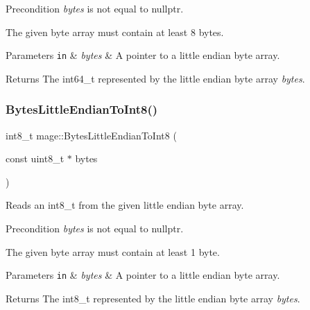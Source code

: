 \begin{DoxyPrecond}{Precondition}
{\itshape bytes} is not equal to {\ttfamily nullptr}. 

The given byte array must contain at least 8 bytes. 
\end{DoxyPrecond}

\begin{DoxyParams}[1]{Parameters}
\mbox{\tt in}  & {\em bytes} & A pointer to a little endian byte array. \\
\hline
\end{DoxyParams}
\begin{DoxyReturn}{Returns}
The {\ttfamily int64\+\_\+t} represented by the little endian byte array {\itshape bytes}. 
\end{DoxyReturn}
\hypertarget{namespacemage_a9153445c824967eb0805eeec7ac8fec5}{}\label{namespacemage_a9153445c824967eb0805eeec7ac8fec5} 
\subsubsection{\texorpdfstring{Bytes\+Little\+Endian\+To\+Int8()}{BytesLittleEndianToInt8()}}
{\footnotesize\ttfamily int8\+\_\+t mage\+::\+Bytes\+Little\+Endian\+To\+Int8 (\begin{DoxyParamCaption}\item[{const uint8\+\_\+t $\ast$}]{bytes }\end{DoxyParamCaption})\hspace{0.3cm}{\ttfamily [noexcept]}}

Reads an int8\+\_\+t from the given little endian byte array.

\begin{DoxyPrecond}{Precondition}
{\itshape bytes} is not equal to {\ttfamily nullptr}. 

The given byte array must contain at least 1 byte. 
\end{DoxyPrecond}

\begin{DoxyParams}[1]{Parameters}
\mbox{\tt in}  & {\em bytes} & A pointer to a little endian byte array. \\
\hline
\end{DoxyParams}
\begin{DoxyReturn}{Returns}
The {\ttfamily int8\+\_\+t} represented by the little endian byte array {\itshape bytes}. 
\end{DoxyReturn}
\hypertarget{namespacemage_a6ed6e28e917535c12c7ea48347d00b1e}{}\label{namespacemage_a6ed6e28e917535c12c7ea48347d00b1e} 
